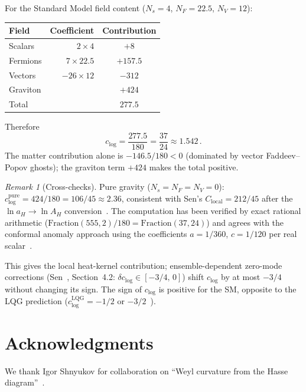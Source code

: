 \documentclass[12pt,a4paper]{article}
\theoremstyle{plain}
\theoremstyle{definition}
\theoremstyle{remark}
\newtheorem{remark}[theorem]{Remark}
\begin{document}
For the Standard Model field content ($N_s = 4$,
$N_F = 22.5$, $N_V = 12$):
\begin{center}
\begin{tabular}{lrc}
\toprule
Field & Coefficient & Contribution \\
\midrule
Scalars  & $2 \times 4$ & $+8$ \\
Fermions & $7 \times 22.5$ & $+157.5$ \\
Vectors  & $-26 \times 12$ & $-312$ \\
Graviton & & $+424$ \\
\midrule
Total    & & $277.5$ \\
\bottomrule
\end{tabular}
\end{center}
Therefore
\begin{equation}\label{eq:clog-result}
  \boxed{c_{\log} = \frac{277.5}{180}
  = \frac{37}{24} \approx 1.542\,.}
\end{equation}
The matter contribution alone is $-146.5/180 < 0$ (dominated by
vector Faddeev--Popov ghosts); the graviton term $+424$ makes the
total positive.

\begin{remark}[Cross-checks]
Pure gravity ($N_s = N_F = N_V = 0$):
$c_{\log}^{\mathrm{pure}} = 424/180 = 106/45 \approx 2.36$,
consistent with Sen's $C_{\mathrm{local}} = 212/45$ after the
$\ln a_H \to \ln A_H$ conversion~\cite{Sen:2012}.  The computation has been verified
by exact rational arithmetic ($\mathrm{Fraction}(555,2)/180
= \mathrm{Fraction}(37,24)$) and agrees with the conformal
anomaly approach using the coefficients $a = 1/360$,
$c = 1/120$ per real scalar~\cite{BirDav:1982}.

This gives the local heat-kernel contribution; ensemble-dependent
zero-mode corrections (Sen~\cite{Sen:2012}, Section~4.2:
$\delta c_{\log} \in [-3/4,\, 0]$) shift $c_{\log}$ by at most
$-3/4$ without changing its sign.  The sign of $c_{\log}$ is
positive for the SM,
opposite to the LQG prediction
($c_{\log}^{\mathrm{LQG}} = -1/2$
or $-3/2$~\cite{Meissner:2004,KaulMajumdar:2000}).
\end{remark}

\section*{Acknowledgments}

We thank Igor Shnyukov for collaboration on
``Weyl curvature from the Hasse diagram''~\cite{Alfyorov:2026paper7}.
\end{document}
